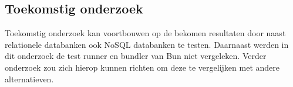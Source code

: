 \documentclass[a0,portrait]{hogent-poster}
\begin{document}
\begin{multicols}{2}
\section{Toekomstig onderzoek}
Toekomstig onderzoek kan voortbouwen op de bekomen resultaten door naast relationele databanken ook NoSQL databanken te testen.
Daarnaast werden in dit onderzoek de test runner en bundler van Bun niet vergeleken. Verder onderzoek zou zich hierop kunnen richten om deze te vergelijken met andere alternatieven.

\end{multicols}
\end{document}
